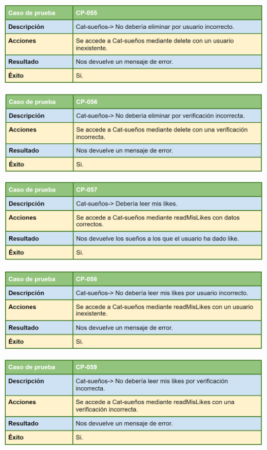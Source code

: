 \bigskip

\includegraphics[width=\textwidth]{img/cap7/cp-055.png}

\bigskip

\includegraphics[width=\textwidth]{img/cap7/cp-056.png}

\bigskip

\includegraphics[width=\textwidth]{img/cap7/cp-057.png}

\bigskip

\includegraphics[width=\textwidth]{img/cap7/cp-058.png}

\bigskip

\includegraphics[width=\textwidth]{img/cap7/cp-059.png}

